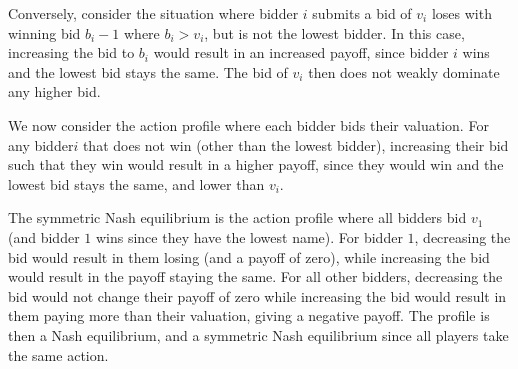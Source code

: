 \documentclass{article}
\begin{document}
Conversely, consider the situation where bidder $i$ submits a bid of $v_i$ loses with winning bid $b_i - 1$ where $b_i > v_i$, but is not the lowest bidder. In this case, increasing the bid to $b_i$ would result in an increased payoff, since bidder $i$ wins and the lowest bid stays the same. The bid of $v_i$ then does not weakly dominate any higher bid.

We now consider the action profile where each bidder bids their valuation. For any bidder$i$ that does not win (other than the lowest bidder), increasing their bid such that they win would result in a higher payoff, since they would win and the lowest bid stays the same, and lower than $v_i$.

The symmetric Nash equilibrium is the action profile where all bidders bid $v_1$ (and bidder $1$ wins since they have the lowest name). For bidder $1$, decreasing the bid would result in them losing (and a payoff of zero), while increasing the bid would result in the payoff staying the same. For all other bidders, decreasing the bid would not change their payoff of zero while increasing the bid would result in them paying more than their valuation, giving a negative payoff. The profile is then a Nash equilibrium, and a symmetric Nash equilibrium since all players take the same action.
\end{document}

